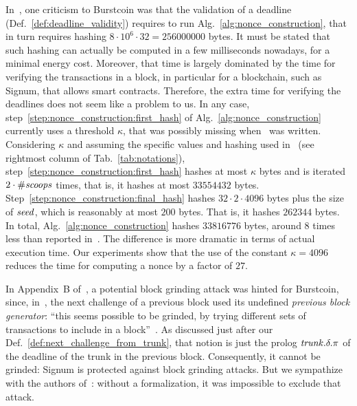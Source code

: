 In~\cite{ParkKFGAP18}, one criticism to Burstcoin was that the validation of a deadline
(Def.~\ref{def:deadline_validity}) requires to run
Alg.~\ref{alg:nonce_construction}, that in turn
requires hashing $8\cdot 10^6\cdot 32=256000000$ bytes.
It must be stated that
such hashing can actually be computed in a few milliseconds nowadays,
for a minimal energy cost. Moreover, that time is largely dominated
by the time for verifying the transactions in a block, in particular
for a blockchain, such as Signum, that allows smart contracts.
Therefore, the extra time for verifying the deadlines does not seem like a problem to us.
In any case, step~\ref{step:nonce_construction:first_hash} of
Alg.~\ref{alg:nonce_construction} currently uses a threshold $\kappa$,
that was possibly missing when~\cite{ParkKFGAP18} was written.
Considering $\kappa$ and assuming the specific values and hashing
used in~\cite{SignumPlotting} (see rightmost column of Tab.~\ref{tab:notations}),
step~\ref{step:nonce_construction:first_hash}
hashes at most $\kappa$ bytes and is iterated $2\cdot{\#\mathit{scoops}}$ times, that is,
it hashes at most $33554432$ bytes.
Step~\ref{step:nonce_construction:final_hash} hashes $32\cdot 2\cdot 4096$ bytes
plus the size of ${\mathit{seed}}$, which is reasonably at most $200$ bytes.
That is, it hashes $262344$ bytes. In total, Alg.~\ref{alg:nonce_construction}
hashes $33816776$ bytes, around $8$ times less than reported in~\cite{ParkKFGAP18}.
The difference is more dramatic in terms of actual execution time. Our experiments
show that the use of the constant $\kappa=4096$ reduces the time for computing
a nonce by a factor of $27$.

In Appendix~B of~\cite{ParkKFGAP18}, a potential block grinding attack was hinted for Burstcoin,
since, in~\cite{SignumPlotting}, the next challenge of a previous block used its undefined
\emph{previous block generator}:
``this seems possible to be grinded, by trying
different sets of transactions to include in a block''~\cite{ParkKFGAP18}.
As discussed just after our Def.~\ref{def:next_challenge_from_trunk}, that notion is
just the prolog ${\mathit{trunk}}.\delta.\pi$ of the deadline of the trunk in the previous block.
Consequently, it cannot be grinded: Signum is protected against block grinding attacks.
But we sympathize with the authors of~\cite{ParkKFGAP18}: without a formalization,
it was impossible to exclude that attack.

